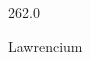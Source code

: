 \documentclass[12pt]{article}
\begin{document}
\hfill{}
\vfill
\begin{center}
  {\fontsize{50}{60}
  }

  262.0

Lawrencium
\end{center}
\vfill
\end{document}
